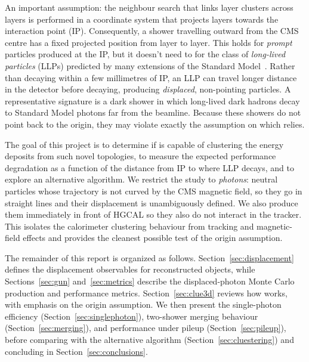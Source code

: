 An important \cluethreed{} assumption: the neighbour search that links layer
clusters across layers is performed in a coordinate system that projects layers towards the interaction point (IP). Consequently, a shower
travelling outward from the CMS centre has a fixed projected position from
layer to layer. This
holds for \emph{prompt} particles produced at the IP, but it doesn't need to for
the class of \emph{long-lived particles} (LLPs) predicted by many extensions of
the Standard Model~\cite{LLPreview}. Rather than decaying within a few
millimetres of IP, an LLP can travel longer distance in the detector before decaying, producing \emph{displaced}, non-pointing
particles. A representative signature is a dark shower in which
long-lived dark hadrons decay to Standard Model photons far from the beamline. Because these showers do not point back to
the origin, they may violate exactly the assumption on which \cluethreed{}
relies.

The goal of this project is to determine
if \cluethreed{} is capable of clustering the energy deposits from such
novel topologies, to measure the expected performance degradation as a function
of the distance from IP to where LLP decays, and to explore an alternative algorithm. We restrict the study to
 \emph{photons}: neutral particles whose trajectory is not curved by the CMS magnetic field, so
they go in straight lines and their displacement is unambiguously defined. We also produce them immediately in front of HGCAL so they also do not interact in the tracker. This isolates the calorimeter clustering behaviour
from tracking and magnetic-field effects and provides the cleanest possible test
of the origin assumption.

The remainder of this report is organized as follows. Section~\ref{sec:displacement}
defines the displacement observables for reconstructed objects, while
Sections~\ref{sec:gun} and~\ref{sec:metrics} describe the displaced-photon Monte
Carlo production and performance metrics. Section~\ref{sec:clue3d} reviews how
\cluethreed{} works, with emphasis on the origin assumption. We then present
the single-photon efficiency (Section~\ref{sec:singlephoton}), two-shower
merging behaviour (Section~\ref{sec:merging}), and performance under pileup
(Section~\ref{sec:pileup}), before comparing \cluethreed{} with the alternative
algorithm \cluestering{} (Section~\ref{sec:cluestering}) and concluding in
Section~\ref{sec:conclusions}.
